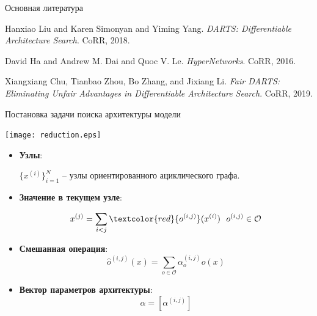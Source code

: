 \documentclass{beamer}
\begin{document}
\begin{frame}{Основная литература}

\begin{thebibliography}{1}


Hanxiao Liu and Karen Simonyan and Yiming Yang. 
\textit{DARTS: Differentiable Architecture Search}.
CoRR, 2018.

David Ha and Andrew M. Dai and Quoc V. Le.
\textit{HyperNetworks}. 
CoRR, 2016.

Xiangxiang Chu, Tianbao Zhou, Bo Zhang, and Jixiang Li.
\textit{Fair DARTS: Eliminating Unfair Advantages in
	Differentiable Architecture Search}.
CoRR, 2019.

\end{thebibliography}			
\end{frame}




\begin{frame}{Постановка задачи поиска архитектуры модели}

\begin{center}
\texttt{[image: reduction.eps]}
\end{center}

\begin{itemize}

\item \textbf{Узлы}:

 $\{x^{(i)}\}_{i=1}^N$ -- узлы ориентированного ациклического графа. 

\item \textbf{Значение в текущем узле}:

 $$x^{(j)} = \sum_{i < j}\textcolor{red}{o^{(i, j)}}(x^{(i)})~~o^{(i, j)} \in\mathcal{O}$$


\item \textbf{Смешанная операция}: $$\hat{o}^{(i, j)}(x) = \sum_{o\in \mathcal{O}} \alpha_o^{(i, j)}o(x)$$

\item \textbf{Вектор параметров архитектуры}: $$\alpha = [\alpha^{(i, j)}]$$

\end{itemize}
\end{frame}
\end{document}
